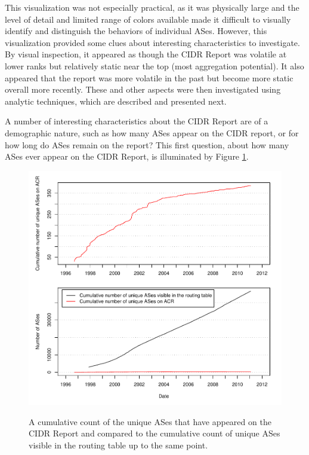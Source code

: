 This visualization was not especially practical, as it was physically large and
the level of detail and limited range of colors available made it difficult to
visually identify and distinguish the behaviors of individual ASes. However,
this visualization provided some clues about interesting characteristics to
investigate. By visual inspection, it appeared as though the CIDR Report was
volatile at lower ranks but relatively static near the top (most aggregation
potential). It also appeared that the report was more volatile in the past but
become more static overall more recently. These and other aspects were then
investigated using analytic techniques, which are described and presented next.

A number of interesting characteristics about the CIDR Report are of a
demographic nature, such as how many ASes appear on the CIDR report, or for how
long do ASes remain on the report? This first question, about how many ASes
ever appear on the CIDR Report, is illuminated by Figure \ref{fig:as_counts}.

\begin{figure}[h!]
\begin{centering}
\begin{singlespace}
    \includegraphics[width=6in]{figures/cumulative_asn_counts.pdf}
    \vspace{-2em}\\
    \caption{A cumulative count of the unique ASes that have appeared on the
        CIDR Report and compared to the cumulative count of unique ASes visible
        in the routing table up to the same point.}
    \label{fig:as_counts}
\end{singlespace}
\end{centering}
\end{figure}


